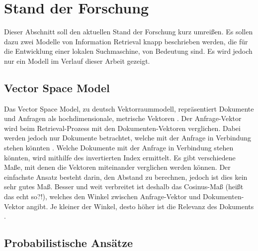 \section{Stand der Forschung}
Dieser Abschnitt soll den aktuellen Stand der Forschung kurz umreißen.
Es sollen dazu zwei Modelle von Information Retrieval knapp beschrieben werden, die für die Entwicklung einer lokalen Suchmaschine, von Bedeutung sind. Es wird jedoch nur ein Modell im Verlauf dieser Arbeit gezeigt.
\newline

\subsection{Vector Space Model}
Das Vector Space Model, zu deutsch Vektorraummodell, repräsentiert Dokumente und Anfragen als hochdimensionale, metrische Vektoren \cite{VR_Retrieval}.
Der Anfrage-Vektor wird beim Retrieval-Prozess mit den Dokumenten-Vektoren verglichen. Dabei werden jedoch nur Dokumente betrachtet, welche mit der Anfrage in Verbindung stehen könnten \cite{klass_IR}. Welche Dokumente mit der Anfrage in Verbindung stehen könnten, wird mithilfe des invertierten Index ermittelt.
\newline
Es gibt verschiedene Maße, mit denen die Vektoren miteinander verglichen werden können. Der einfachste Ansatz besteht darin, den Abstand zu berechnen, jedoch ist dies kein sehr gutes Maß. 
Besser und weit verbreitet ist deshalb das Cosinus-Maß (heißt das echt so?!), welches den Winkel zwischen Anfrage-Vektor und Dokumenten-Vektor angibt. Je kleiner der Winkel, desto höher ist die Relevanz des Dokuments  \cite{IR_Uni_Duisburg}.

\subsection{Probabilistische Ansätze}
